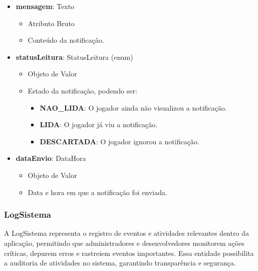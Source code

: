 \begin{itemize}
        \item \textbf{mensagem}: Texto  
              \begin{itemize}
                  \item Atributo Bruto
                  \item Conteúdo da notificação.
              \end{itemize}
    
        \item \textbf{statusLeitura}: StatusLeitura (enum)  
              \begin{itemize}
                  \item Objeto de Valor
                  \item Estado da notificação, podendo ser:
                  \begin{itemize}
                      \item \textbf{NAO\_LIDA}: O jogador ainda não visualizou a notificação.
                      \item \textbf{LIDA}: O jogador já viu a notificação.
                      \item \textbf{DESCARTADA}: O jogador ignorou a notificação.
                  \end{itemize}
              \end{itemize}
    
        \item \textbf{dataEnvio}: DataHora  
              \begin{itemize}
                  \item Objeto de Valor
                  \item Data e hora em que a notificação foi enviada.
              \end{itemize}
    \end{itemize}

    
    \subsubsection{LogSistema}
    A LogSistema representa o registro de eventos e atividades relevantes dentro da aplicação, permitindo que administradores e desenvolvedores monitorem ações críticas, depurem erros e rastreiem eventos importantes. Essa entidade possibilita a auditoria de atividades no sistema, garantindo transparência e segurança.

